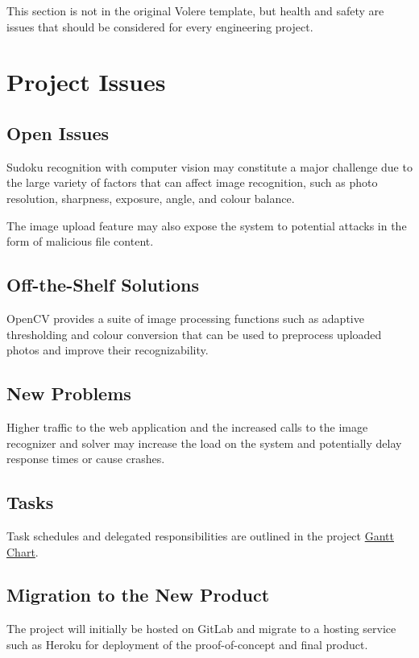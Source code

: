 \documentclass[11pt]{article}
\begin{document}
This section is not in the original Volere template, but health and safety are
issues that should be considered for every engineering project.

\section{Project Issues}

\subsection{Open Issues}
Sudoku recognition with computer vision may constitute a major challenge due to the large variety of factors that can affect image recognition, such as photo resolution, sharpness, exposure, angle, and colour balance. 

The image upload feature may also expose the system to potential attacks in the form of malicious file content.

\subsection{Off-the-Shelf Solutions}
OpenCV provides a suite of image processing functions such as adaptive thresholding and colour conversion that can be used to preprocess uploaded photos and improve their recognizability. 

\subsection{New Problems}
Higher traffic to the web application and the increased calls to the image recognizer and solver may increase the load on the system and potentially delay response times or cause crashes.

\subsection{Tasks}
Task schedules and delegated responsibilities are outlined in the project \href{https://gitlab.cas.mcmaster.ca/bhuiyr2/sudokusolver_l02_grp08/-/blob/main/ProjectSchedule/Gantt_Sudoku.pdf}{Gantt Chart}.

\subsection{Migration to the New Product}
The project will initially be hosted on GitLab and migrate to a hosting service such as Heroku for deployment of the proof-of-concept and final product.
\end{document}
